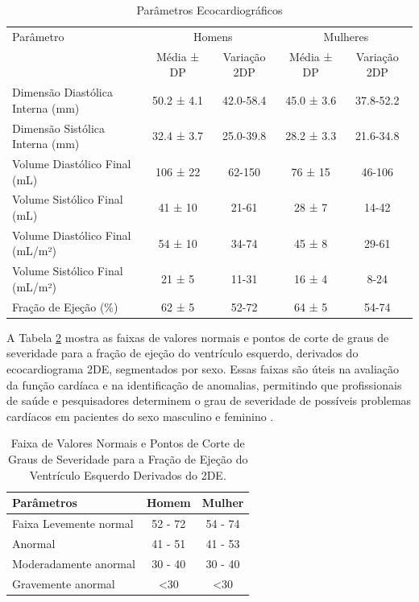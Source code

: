 \begin{table}[htbp]
\centering
\small %
\caption{Parâmetros Ecocardiográficos}
\label{tab:echoparams}
\begin{tabular}{lcccc}
\toprule
Parâmetro & \multicolumn{2}{c}{Homens} & \multicolumn{2}{c}{Mulheres} \\
\cmidrule(lr){2-3} \cmidrule(lr){4-5}
& Média ± DP & Variação 2DP & Média ± DP & Variação 2DP \\
\midrule
Dimensão Diastólica Interna (mm) & 50.2 ± 4.1 & 42.0-58.4 & 45.0 ± 3.6 & 37.8-52.2 \\
Dimensão Sistólica Interna (mm) & 32.4 ± 3.7 & 25.0-39.8 & 28.2 ± 3.3 & 21.6-34.8 \\
Volume Diastólico Final (mL) & 106 ± 22 & 62-150 & 76 ± 15 & 46-106 \\
Volume Sistólico Final (mL) & 41 ± 10 & 21-61 & 28 ± 7 & 14-42 \\
Volume Diastólico Final (mL/m²) & 54 ± 10 & 34-74 & 45 ± 8 & 29-61 \\
Volume Sistólico Final (mL/m²) & 21 ± 5 & 11-31 & 16 ± 4 & 8-24 \\
Fração de Ejeção (\%) & 62 ± 5 & 52-72 & 64 ± 5 & 54-74 \\
\bottomrule
\end{tabular}
\end{table}



A Tabela \ref{tab:severidade_ve} mostra as faixas de valores normais e pontos de corte de graus de severidade para a fração de ejeção do ventrículo esquerdo, derivados do ecocardiograma 2DE, segmentados por sexo. Essas faixas são úteis na avaliação da função cardíaca e na identificação de anomalias, permitindo que profissionais de saúde e pesquisadores determinem o grau de severidade de possíveis problemas cardíacos em pacientes do sexo masculino e feminino \cite{Lang2015}.

\begin{table}[htbp]
\centering
\caption{Faixa de Valores Normais e Pontos de Corte de Graus de Severidade para a Fração de Ejeção do Ventrículo Esquerdo Derivados do 2DE.}
\label{tab:severidade_ve}
\begin{tabular}{lcc}
\toprule
\textbf{Parâmetros} & \textbf{Homem} & \textbf{Mulher} \\
\midrule
Faixa Levemente normal & 52 - 72 & 54 - 74 \\
Anormal & 41 - 51 & 41 - 53 \\
Moderadamente anormal & 30 - 40 & 30 - 40 \\
Gravemente anormal & <30 & <30 \\
\bottomrule
\end{tabular}
\end{table}

